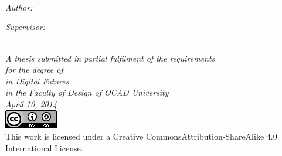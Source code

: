 \documentclass[11pt, letterpaper, oneside]{Thesis} %
\begin{document}
\begin{titlepage}
\HRule \\[0.4cm] %
{\large \bfseries \ttitle}\\[0.4cm] %
\HRule \\[8.5cm] %

\begin{minipage}{0.4\textwidth}
\begin{flushleft} \large
\emph{Author:}\\
\href{http://www.alexleitch.com}{\authornames} %
\end{flushleft}
\end{minipage}

\begin{minipage}{0.4\textwidth}
\begin{flushleft} \large
\emph{Supervisor:} \\
\href{https://twitter.com/emmawestecott}{\supname} %
\end{flushleft}
\end{minipage}\\[0.5cm]
 
\large \textit{A thesis submitted in partial fulfilment of the requirements\\ for the degree of \degreename}\\%
\textit{in Digital Futures}\\ %
\textit{in the Faculty of Design of OCAD University}\\
\textit{April 10, 2014}\\ %

 \includegraphics[scale=0.8]{cc-sa-by.png}\\
 This work is licensed under a Creative Commons\newline Attribution-ShareAlike 4.0 International License.

\end{titlepage}
\setcounter{page}{2}

\end{document}
